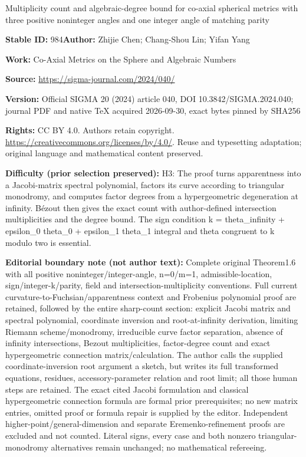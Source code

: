 \documentclass[11pt]{article}
\numberwithin{equation}{section}
\numberwithin{equation}{section}
\begin{document}
\begin{center}\Large Multiplicity count and algebraic-degree bound for co-axial spherical metrics with three positive noninteger angles and one integer angle of matching parity\end{center}
\noindent\textbf{Stable ID:} 984\quad\textbf{Author:} Zhijie Chen; Chang-Shou Lin; Yifan Yang\par
\noindent\textbf{Work:} Co-Axial Metrics on the Sphere and Algebraic Numbers\par
\noindent\textbf{Source:} \url{https://sigma-journal.com/2024/040/}\par
\noindent\textbf{Version:} Official SIGMA 20 (2024) article 040, DOI 10.3842/SIGMA.2024.040; journal PDF and native TeX acquired 2026-09-30, exact bytes pinned by SHA256\par
\noindent\textbf{Rights:} CC BY 4.0. Authors retain copyright. \url{https://creativecommons.org/licenses/by/4.0/}. Reuse and typesetting adaptation; original language and mathematical content preserved.\par
\noindent\textbf{Difficulty (prior selection preserved):} {\CJKfont H3: The proof turns apparentness into a Jacobi-matrix spectral polynomial, factors its curve according to triangular monodromy, and computes factor degrees from a hypergeometric degeneration at infinity. Bézout then gives the exact count with author-defined intersection multiplicities and the degree bound. The sign condition k = theta\_infinity + epsilon\_0 theta\_0 + epsilon\_1 theta\_1 integral and theta congruent to k modulo two is essential.}\par
\medskip\noindent\textbf{Editorial boundary note (not author text):} Complete original Theorem1.6 with all positive noninteger/integer-angle, n=0/m=1, admissible-location, sign/integer-k/parity, field and intersection-multiplicity conventions. Full current curvature-to-Fuchsian/apparentness context and Frobenius polynomial proof are retained, followed by the entire sharp-count section: explicit Jacobi matrix and spectral polynomial, coordinate inversion and root-at-infinity derivation, limiting Riemann scheme/monodromy, irreducible curve factor separation, absence of infinity intersections, Bezout multiplicities, factor-degree count and exact hypergeometric connection matrix/calculation. The author calls the supplied coordinate-inversion root argument a sketch, but writes its full transformed equations, residues, accessory-parameter relation and root limit; all those human steps are retained. The exact cited Jacobi formulation and classical hypergeometric connection formula are formal prior prerequisites; no new matrix entries, omitted proof or formula repair is supplied by the editor. Independent higher-point/general-dimension and separate Eremenko-refinement proofs are excluded and not counted. Literal signs, every case and both nonzero triangular-monodromy alternatives remain unchanged; no mathematical refereeing.\par
\end{document}
